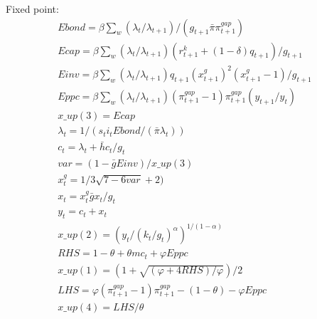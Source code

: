 \documentclass[12pt, final]{article}
\begin{document}
\setcounter{equation}{0}
\noindent Fixed point:
\small\begin{gather}
Ebond = \beta\sum_w(\lambda_t/\lambda_{t+1})/(g_{t+1}\bar{\pi}\pi^{gap}_{t+1})\\
Ecap = \beta\sum_w(\lambda_t/\lambda_{t+1})(r^k_{t+1}+(1-\delta)q_{t+1})/g_{t+1}\\
Einv = \beta\sum_w(\lambda_t/\lambda_{t+1})q_{t+1} (x^g_{t+1})^2 (x^g_{t+1}-1)/g_{t+1}\\
Eppc = \beta\sum_w(\lambda_t/\lambda_{t+1})(\pi^{gap}_{t+1}-1)\pi^{gap}_{t+1}(y_{t+1}/y_t)\\
x\_up(3) = Ecap\\
\lambda_{t} = 1/(s_ti_tEbond/(\bar{\pi}\lambda_t))\\
c_{t} = \lambda_{t} + \bar{h}c_t/g_t\\
var = (1-\bar{g}Einv)/x\_up(3)\\
x^g_{t} = 1/3\sqrt{7-6var}+2)\\
x_{t} = x^g_{t}\bar{g}x_t/g_t\\
y_{t} = c_{t} + x_{t}\\
x\_up(2) = (y_{t}/(k_t/g_t)^\alpha)^{1/(1-\alpha)}\\%
RHS = 1 - \theta + \theta mc_t + \varphi Eppc\\
x\_up(1) = (1+\sqrt{(\varphi+4RHS)/\varphi})/2\\
LHS = \varphi(\pi^{gap}_{t+1}-1)\pi^{gap}_{t+1}-(1-\theta)-\varphi Eppc\\
x\_up(4) = LHS/\theta
\end{gather}
\end{document}
